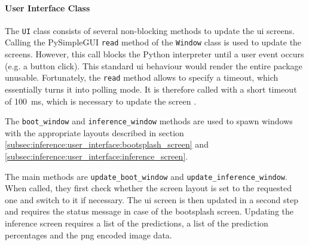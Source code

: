 \paragraph{User Interface Class}
The \texttt{UI} class consists of several non-blocking methods to update the \acrlong{ui} screens.
Calling the PySimpleGUI \texttt{read} method of the \texttt{Window} class is used to update the screens.
However, this call blocks the Python interpreter until a user event occurs (e.g. a button click).
This standard \acrlong{ui} behaviour would render the entire package unusable.
Fortunately, the \texttt{read} method allows to specify a timeout, which essentially turns it into polling mode.
It is therefore called with a short timeout of \SI{100}{ms}, which is necessary to update the screen \cite{inf_pysimplegui_ref}.

The \texttt{boot\_window} and \texttt{inference\_window} methods are used to spawn windows with the appropriate layouts described in section \ref{subsec:inference:user_interface:bootsplash_screen} and \ref{subsec:inference:user_interface:inference_screen}.

The main methods are \texttt{update\_boot\_window} and \texttt{update\_inference\_window}.
When called, they first check whether the screen layout is set to the requested one and switch to it if necessary.
The \acrlong{ui} screen is then updated in a second step and requires the status message in case of the bootsplash screen.
Updating the inference screen requires a list of the predictions, a list of the prediction percentages and the \acrshort{png} encoded image data.

